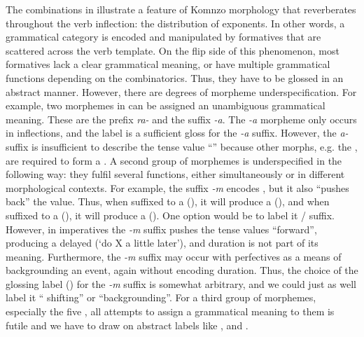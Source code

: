 The combinations in  illustrate a feature of Komnzo morphology that reverberates throughout the verb inflection: the distribution of exponents. In other words, a grammatical category is encoded and manipulated by formatives that are scattered across the verb template. On the flip side of this phenomenon, most formatives lack a clear grammatical meaning, or have multiple grammatical functions depending on the combinatorics. Thus, they have to be glossed in an abstract manner. However, there are degrees of morpheme underspecification. For example, two morphemes in  can be assigned an unambiguous grammatical meaning. These are the  prefix \emph{ra-} and the  suffix \emph{-a}. The \emph{-a} morpheme only occurs in   inflections, and the label \Pst{} is a sufficient gloss for the \emph{-a} suffix. However, the \emph{a-} suffix is insufficient to describe the tense value ``'' because other morphs, e.g. the , are required to form a  . A second group of morphemes is underspecified in the following way: they fulfil several functions, either simultaneously or in different morphological contexts. For example, the  suffix \emph{-m} encodes  , but it also ``pushes back'' the  value. Thus, when suffixed to a  (), it will produce a  (), and when suffixed to a  (), it will produce a  (). One option would be to label it / suffix. However, in imperatives the \emph{-m} suffix pushes the tense values ``forward'', producing a delayed  (`do X a little later'), and duration is not part of its meaning. Furthermore, the \emph{-m} suffix may occur with perfectives as a means of backgrounding an event, again without encoding duration. Thus, the choice of the glossing label (\Dur) for the \emph{-m} suffix is somewhat arbitrary, and we could just as well label it `` shifting'' or ``backgrounding''. For a third group of morphemes, especially the five , all attempts to assign a grammatical meaning to them is futile and we have to draw on abstract labels like \Alph{}, \Bet{} and \Gam{}.

